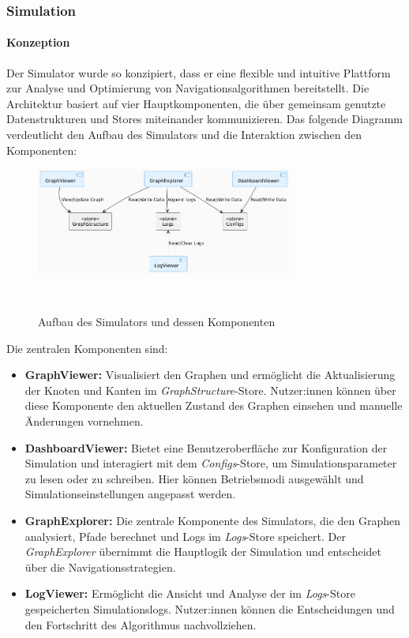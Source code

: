 \documentclass[main.tex]{subfiles} %
\begin{document}
\subsubsection{Simulation}

\paragraph{Konzeption}

Der Simulator wurde so konzipiert, dass er eine flexible und intuitive Plattform zur Analyse und Optimierung von Navigationsalgorithmen bereitstellt. Die Architektur basiert auf vier Hauptkomponenten, die über gemeinsam genutzte Datenstrukturen und Stores miteinander kommunizieren. Das folgende Diagramm verdeutlicht den Aufbau des Simulators und die Interaktion zwischen den Komponenten:

\begin{figure}[H]
    \centering
    \includegraphics[width=0.75\textwidth]{./fig_Simulation/SimulatorKomponentenDiagramm.png}
    \caption{Aufbau des Simulators und dessen Komponenten}~\label{fig:SimulatorKomponentenDiagramm}
\end{figure}

Die zentralen Komponenten sind:
\begin{itemize}
    \item \textbf{GraphViewer:} Visualisiert den Graphen und ermöglicht die Aktualisierung der Knoten und Kanten im \textit{GraphStructure}-Store. Nutzer:innen können über diese Komponente den aktuellen Zustand des Graphen einsehen und manuelle Änderungen vornehmen.
    \item \textbf{DashboardViewer:} Bietet eine Benutzeroberfläche zur Konfiguration der Simulation und interagiert mit dem \textit{Configs}-Store, um Simulationsparameter zu lesen oder zu schreiben. Hier können Betriebsmodi ausgewählt und Simulationseinstellungen angepasst werden.
    \item \textbf{GraphExplorer:} Die zentrale Komponente des Simulators, die den Graphen analysiert, Pfade berechnet und Logs im \textit{Logs}-Store speichert. Der \textit{GraphExplorer} übernimmt die Hauptlogik der Simulation und entscheidet über die Navigationsstrategien.
    \item \textbf{LogViewer:} Ermöglicht die Ansicht und Analyse der im \textit{Logs}-Store gespeicherten Simulationslogs. Nutzer:innen können die Entscheidungen und den Fortschritt des Algorithmus nachvollziehen.
\end{itemize}
\end{document}
